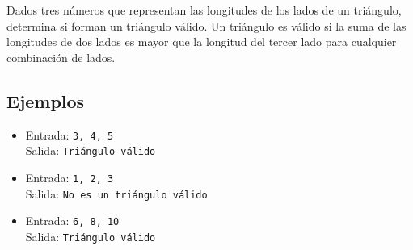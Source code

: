 Dados tres números que representan las longitudes de los lados de un triángulo, determina si forman un triángulo válido. Un triángulo es válido si la suma de las longitudes de dos lados es mayor que la longitud del tercer lado para cualquier combinación de lados.
\subsection*{Ejemplos}
\begin{itemize}
    \item Entrada: \texttt{3, 4, 5}\\
          Salida: \texttt{Triángulo válido}
    \item Entrada: \texttt{1, 2, 3}\\
          Salida: \texttt{No es un triángulo válido}
    \item Entrada: \texttt{6, 8, 10}\\
          Salida: \texttt{Triángulo válido}
\end{itemize}